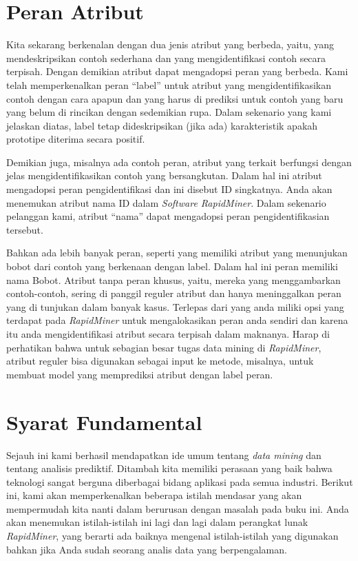 \section{Peran Atribut}
\par Kita sekarang  berkenalan dengan dua jenis atribut yang berbeda, yaitu, yang mendeskripsikan contoh sederhana dan yang mengidentifikasi contoh secara terpisah. Dengan demikian atribut dapat mengadopsi peran yang berbeda. Kami telah memperkenalkan peran “label” untuk atribut yang mengidentifikasikan contoh dengan cara apapun dan yang harus di prediksi untuk contoh yang baru yang belum di rincikan dengan sedemikian rupa. Dalam sekenario yang kami jelaskan diatas, label tetap dideskripsikan (jika ada) karakteristik apakah prototipe diterima secara positif.

\par Demikian juga, misalnya ada contoh peran, atribut yang terkait berfungsi dengan jelas mengidentifikasikan contoh yang bersangkutan. Dalam hal ini atribut mengadopsi peran  pengidentifikasi dan ini disebut ID singkatnya. Anda akan menemukan atribut nama ID dalam\textit{ Software RapidMiner}.  Dalam  sekenario pelanggan kami, atribut “nama” dapat mengadopsi peran pengidentifikasian tersebut. 

\par Bahkan ada lebih banyak peran, seperti yang memiliki atribut yang menunjukan bobot dari contoh yang berkenaan dengan label. Dalam hal ini peran memiliki nama Bobot. Atribut tanpa peran khusus, yaitu, mereka yang menggambarkan contoh-contoh, sering di panggil reguler atribut dan hanya meninggalkan peran yang di tunjukan dalam banyak kasus. Terlepas dari yang anda miliki opsi yang terdapat pada \textit{RapidMiner} untuk mengalokasikan peran anda sendiri dan karena itu anda mengidentifikasi atribut secara terpisah dalam maknanya. Harap di perhatikan bahwa untuk sebagian besar tugas  data mining di \textit{RapidMiner}, atribut reguler bisa digunakan sebagai input ke metode, misalnya, untuk membuat model yang memprediksi atribut dengan label peran.

\section{Syarat Fundamental }
\par Sejauh ini kami berhasil mendapatkan ide umum tentang \textit{data mining }dan tentang analisis prediktif. Ditambah kita memiliki perasaan yang baik bahwa teknologi sangat berguna diberbagai bidang aplikasi pada semua industri. Berikut ini, kami akan memperkenalkan beberapa istilah mendasar yang akan mempermudah kita nanti dalam berurusan dengan masalah pada buku ini. Anda akan menemukan istilah-istilah ini lagi dan lagi dalam perangkat lunak \textit{RapidMiner}, yang berarti ada baiknya mengenal istilah-istilah yang digunakan bahkan jika Anda sudah seorang analis data yang berpengalaman. 

